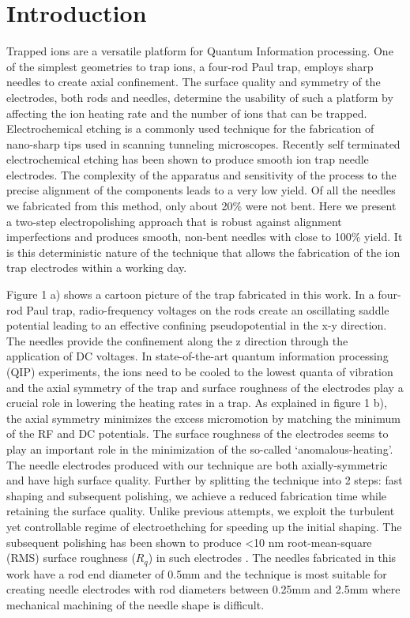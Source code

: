 \documentclass[%
 aip,
 amsmath,amssymb,
 reprint,%
]{revtex4-1}
\begin{document}
\section{\label{sec:level1 introduction}Introduction \protect}

Trapped ions are a versatile platform for Quantum Information processing.
One of the simplest geometries to trap ions, a four-rod Paul trap, employs sharp needles to create axial confinement\cite{PaulTrapOriginal,FourRodQIP1,FourRodQIP2,Shih2021}.
The surface quality and symmetry of the electrodes, both rods and needles, determine the usability of such a platform by affecting the ion heating rate\cite{Anomalous1,Anomalous2,Anomalous3,Anomalous4} and the number of ions that can be trapped.
Electrochemical etching is a commonly used technique for the fabrication of nano-sharp tips\cite{STMtips1, STMtips2} used in scanning tunneling microscopes. 
Recently self terminated electrochemical etching has been shown to produce smooth ion trap needle electrodes\cite{Wang2016}.
The complexity of the apparatus and sensitivity of the process to the precise alignment of the components leads to a very low yield. 
Of all the needles we fabricated from this method, only about 20\% were not bent.
Here we present a two-step electropolishing approach that is robust against alignment imperfections and produces smooth, non-bent needles with close to 100\% yield. 
It is this deterministic nature of the technique that allows the fabrication of the ion trap electrodes within a working day.

Figure 1 a) shows a cartoon picture of the trap fabricated in this work.
In a four-rod Paul trap, radio-frequency voltages on the rods create an oscillating saddle potential leading to an effective confining pseudopotential in the x-y direction.
The needles provide the confinement along the z direction through the application of DC voltages.
In state-of-the-art quantum information processing (QIP) experiments, the ions need to be cooled to the lowest quanta of vibration and the axial symmetry of the trap and surface roughness of the electrodes play a crucial role in lowering the heating rates in a trap.
As explained in figure 1 b), the axial symmetry minimizes the excess micromotion by matching the minimum of the RF and DC potentials.
The surface roughness of the electrodes seems to play an important role in the minimization of the so-called `anomalous-heating'\cite{AnomalousRed1,AnomalousRed2,AnomalousRed3}.
The needle electrodes produced with our technique are both axially-symmetric and have high surface quality.
Further by splitting the technique into 2 steps: fast shaping and subsequent polishing, we achieve a reduced fabrication time while retaining the surface quality.
Unlike previous attempts, we exploit the turbulent yet controllable regime of electroethching for speeding up the initial shaping.
The subsequent polishing has been shown to produce <10 nm root-mean-square (RMS) surface roughness ($R_q$) in such electrodes \cite{Wang2016}.
The needles fabricated in this work have a rod end diameter of 0.5mm and the technique is most suitable for creating needle electrodes with rod diameters between 0.25mm and 2.5mm where mechanical machining of the needle shape is difficult.
 
\end{document}
